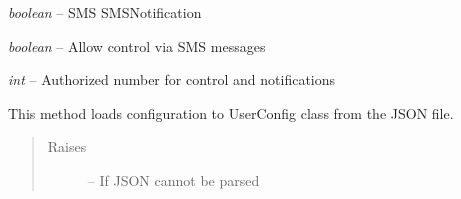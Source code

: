 \documentclass[letterpaper,10pt,english,openany]{sphinxmanual}
\begin{document}
\begin{fulllineitems}
\begin{fulllineitems}
\end{fulllineitems}


\begin{fulllineitems}
\label{index:rpicameramon.config.UserConfig.SMSNotification}
\emph{boolean} -- SMS SMSNotification

\end{fulllineitems}


\begin{fulllineitems}
\label{index:rpicameramon.config.UserConfig.SMSControl}
\emph{boolean} -- Allow control via SMS messages

\end{fulllineitems}


\begin{fulllineitems}
\label{index:rpicameramon.config.UserConfig.authorizedNumber}
\emph{int} -- Authorized number for control and notifications

\end{fulllineitems}


\begin{fulllineitems}
\label{index:rpicameramon.config.UserConfig.load_config}
This method loads configuration to UserConfig class from the JSON file.
\begin{quote}\begin{description}
\item[{Raises}] \leavevmode
{} -- If JSON cannot be parsed

\end{description}\end{quote}

\end{fulllineitems}


\end{fulllineitems}
\end{document}
